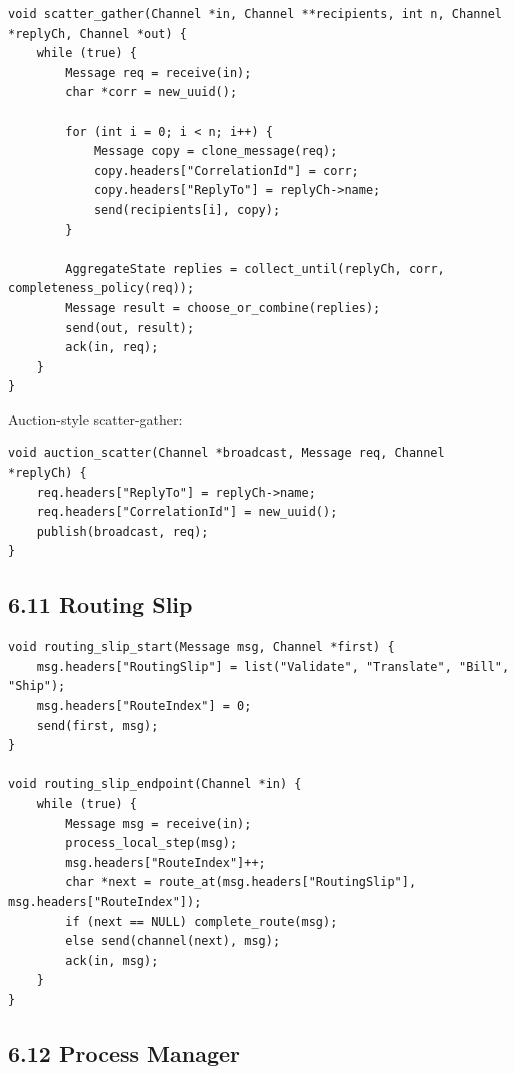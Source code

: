 \documentclass[11pt]{article}
\begin{document}
\begin{verbatim}
void scatter_gather(Channel *in, Channel **recipients, int n, Channel *replyCh, Channel *out) {
    while (true) {
        Message req = receive(in);
        char *corr = new_uuid();

        for (int i = 0; i < n; i++) {
            Message copy = clone_message(req);
            copy.headers["CorrelationId"] = corr;
            copy.headers["ReplyTo"] = replyCh->name;
            send(recipients[i], copy);
        }

        AggregateState replies = collect_until(replyCh, corr, completeness_policy(req));
        Message result = choose_or_combine(replies);
        send(out, result);
        ack(in, req);
    }
}
\end{verbatim}

Auction-style scatter-gather:

\begin{verbatim}
void auction_scatter(Channel *broadcast, Message req, Channel *replyCh) {
    req.headers["ReplyTo"] = replyCh->name;
    req.headers["CorrelationId"] = new_uuid();
    publish(broadcast, req);
}
\end{verbatim}

\subsection{6.11 Routing Slip}\label{routing-slip}

\begin{verbatim}
void routing_slip_start(Message msg, Channel *first) {
    msg.headers["RoutingSlip"] = list("Validate", "Translate", "Bill", "Ship");
    msg.headers["RouteIndex"] = 0;
    send(first, msg);
}

void routing_slip_endpoint(Channel *in) {
    while (true) {
        Message msg = receive(in);
        process_local_step(msg);
        msg.headers["RouteIndex"]++;
        char *next = route_at(msg.headers["RoutingSlip"], msg.headers["RouteIndex"]);
        if (next == NULL) complete_route(msg);
        else send(channel(next), msg);
        ack(in, msg);
    }
}
\end{verbatim}

\subsection{6.12 Process Manager}\label{process-manager}
\end{document}
